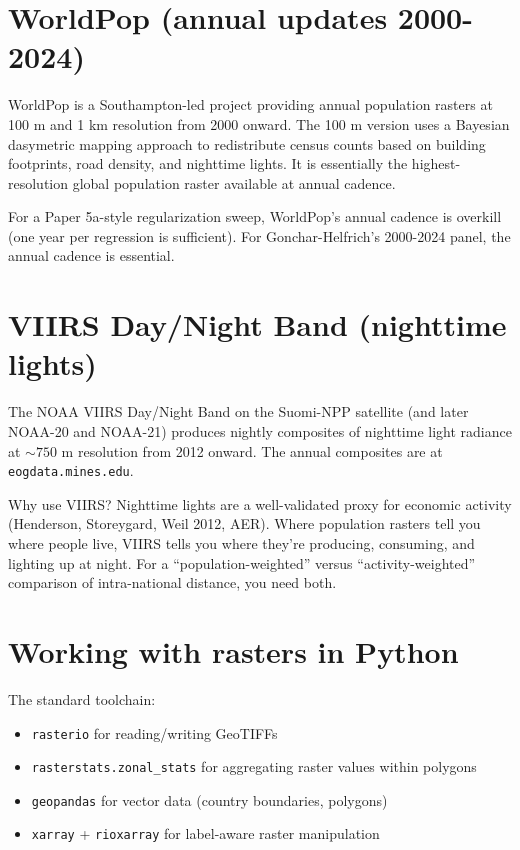 \documentclass[11pt,letterpaper,oneside]{book}
\theoremstyle{definition}
\theoremstyle{remark}
\begin{document}
\section{WorldPop (annual updates 2000-2024)}

WorldPop is a Southampton-led project providing annual population
rasters at 100 m and 1 km resolution from 2000 onward. The 100 m
version uses a Bayesian dasymetric mapping approach to redistribute
census counts based on building footprints, road density, and
nighttime lights. It is essentially the highest-resolution global
population raster available at annual cadence.

For a Paper 5a-style regularization sweep, WorldPop's annual cadence
is overkill (one year per regression is sufficient). For
Gonchar-Helfrich's 2000-2024 panel, the annual cadence is essential.

\section{VIIRS Day/Night Band (nighttime lights)}

The NOAA VIIRS Day/Night Band on the Suomi-NPP satellite (and later
NOAA-20 and NOAA-21) produces nightly composites of nighttime light
radiance at $\sim 750$ m resolution from 2012 onward. The annual
composites are at \texttt{eogdata.mines.edu}.

Why use VIIRS? Nighttime lights are a well-validated proxy for
economic activity (Henderson, Storeygard, Weil 2012, AER). Where
population rasters tell you where people live, VIIRS tells you where
they're producing, consuming, and lighting up at night. For a
``population-weighted'' versus ``activity-weighted'' comparison of
intra-national distance, you need both.

\section{Working with rasters in Python}

The standard toolchain:
\begin{itemize}
  \item \texttt{rasterio} for reading/writing GeoTIFFs
  \item \texttt{rasterstats.zonal\_stats} for aggregating raster values within polygons
  \item \texttt{geopandas} for vector data (country boundaries, polygons)
  \item \texttt{xarray} + \texttt{rioxarray} for label-aware raster manipulation
\end{itemize}
\end{document}
